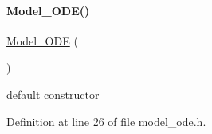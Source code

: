 \paragraph{\texorpdfstring{Model\_ODE()}{Model\_ODE()}\hspace{0.1cm}{\footnotesize\ttfamily [1/2]}}
{\footnotesize\ttfamily \mbox{\hyperlink{classamici_1_1_model___o_d_e}{Model\+\_\+\+O\+DE}} (\begin{DoxyParamCaption}{ }\end{DoxyParamCaption})}

default constructor 

Definition at line 26 of file model\+\_\+ode.\+h.

\mbox{\label{classamici_1_1_model___o_d_e_ad79df95dc03f27d06c0e89f290bfa08a}} 
